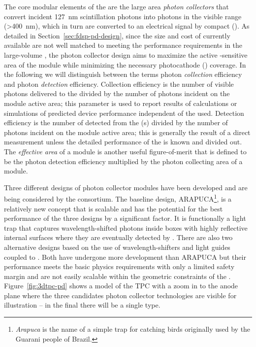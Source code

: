 The core modular elements of the  are the large area \textit{photon collectors} that convert incident \SI{127}{nm} scintillation photons into photons in the visible range (>\SI{400}{nm}), which in turn are converted to an electrical signal by compact (). 
As detailed in Section~\ref{sec:fdsp-pd-design}, since the size and cost of currently available  are not well matched to meeting the performance requirements in the large-volume  , the photon collector design aims to maximize the active -sensitive area of the  module while minimizing the necessary photocathode () coverage. 
In the following we will distinguish between the terms photon \textit{collection} efficiency and photon \textit{detection} efficiency. Collection efficiency is the number of visible photons delivered to the  divided by the number of  photons incident on the  module active area; this parameter is used to report results of calculations or simulations of predicted device performance independent of the  used.  Detection efficiency is the number of detected \phel from the (s) divided by the number of  photons incident on the  module active area; this is generally the result of a direct measurement unless the detailed performance of the  is known and divided out. The \textit{effective area} of a  module is another useful figure-of-merit that is defined to be the photon detection efficiency multiplied by the photon collecting area of a  module. 

Three different designs of  photon collector modules have been developed and are being considered by the \single {} consortium. The baseline design, ARAPUCA\footnote{\textit{Arapuca} is the name of a simple trap for catching birds originally used by the Guarani people of Brazil.}, is a relatively new concept that is scalable and has the potential for the best performance of the three designs by a significant factor. It is functionally a light trap that captures wavelength-shifted photons inside boxes with highly reflective internal surfaces where they are eventually detected by .  There are also two alternative designs based on the use of wavelength-shifters and light guides coupled to . Both have undergone more development than ARAPUCA but their performance meets the basic physics requirements with only a limited safety margin and are not easily scalable within the geometric constraints of the .
Figure~\ref{fig:3dtpc-pd} shows a \threed model of the \single TPC with a zoom in to the anode plane where the three candidates photon collector technologies are visible for illustration -- in the final  there will be a single type.

